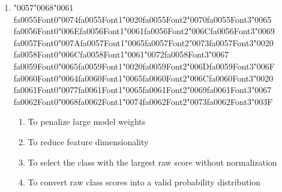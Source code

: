 \documentclass[12pt]{article}
\begin{document}
\begin{enumerate}[label=Q\arabic*.]
\item {\char"0057}{\char"0068}{\char"0061} {\csname fa0055Font0\endcsname\char"0074}{\csname fa0055Font1\endcsname\char"0020}{\csname fa0055Font2\endcsname\char"0070}{\csname fa0055Font3\endcsname\char"0065} {\csname fa0056Font0\endcsname\char"006E}{\csname fa0056Font1\endcsname\char"0061}{\csname fa0056Font2\endcsname\char"006C}{\csname fa0056Font3\endcsname\char"0069} {\csname fa0057Font0\endcsname\char"007A}{\csname fa0057Font1\endcsname\char"0065}{\csname fa0057Font2\endcsname\char"0073}{\csname fa0057Font3\endcsname\char"0020} {\csname fa0058Font0\endcsname\char"006C}{\csname fa0058Font1\endcsname\char"0061}{\char"0072}{\csname fa0058Font3\endcsname\char"0067} {\csname fa0059Font0\endcsname\char"0065}{\csname fa0059Font1\endcsname\char"0020}{\csname fa0059Font2\endcsname\char"006D}{\csname fa0059Font3\endcsname\char"006F} {\csname fa0060Font0\endcsname\char"0064}{\csname fa0060Font1\endcsname\char"0065}{\csname fa0060Font2\endcsname\char"006C}{\csname fa0060Font3\endcsname\char"0020} {\csname fa0061Font0\endcsname\char"0077}{\csname fa0061Font1\endcsname\char"0065}{\csname fa0061Font2\endcsname\char"0069}{\csname fa0061Font3\endcsname\char"0067} {\csname fa0062Font0\endcsname\char"0068}{\csname fa0062Font1\endcsname\char"0074}{\csname fa0062Font2\endcsname\char"0073}{\csname fa0062Font3\endcsname\char"003F}
\begin{enumerate}[label=(\Alph*)]
    \item To penalize large model weights
    \item To reduce feature dimensionality
    \item To select the class with the largest raw score without normalization
    \item To convert raw class scores into a valid probability distribution
\end{enumerate}

\end{enumerate}
\end{document}
